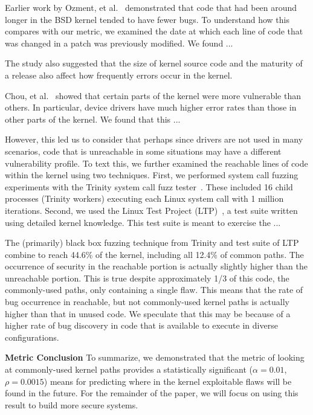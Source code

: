 Earlier work by Ozment, et al.~\cite{ozment2006milk} demonstrated that code that
had been around longer in the BSD kernel tended to have fewer bugs.  To
understand how this compares with our metric, we examined the date at which
each line of code that was changed in a patch was previously modified.  We
found ...


The study also suggested that the size of kernel source code and the
maturity of a release also affect how frequently errors occur in the kernel.

Chou, et al.~\cite{PittSFIeld} showed that certain parts of the kernel
were more vulnerable than others. In particular, device drivers have 
much higher error rates than those in other parts of the kernel.
We found that this ...


However, this led us to consider that perhaps since drivers are not used
in many scenarios, code that is unreachable in some situations may have a 
different vulnerability profile.  To text this, we 
further examined the reachable lines of 
code within the kernel using two techniques.  First, 
we performed system call fuzzing experiments with the Trinity
system call fuzz tester~\cite{Trinity}. These included 16 child processes
(Trinity workers) executing each Linux system call with 1 million iterations.
Second, we used the Linux Test Project (LTP)~\cite{LTP}, a test suite written
using detailed kernel knowledge.  This test suite is meant to exercise the ...

The (primarily) black box fuzzing technique from Trinity and test suite of
LTP combine to reach 44.6\% of the kernel, including all 12.4\% of common
paths.  The occurrence of security in the reachable portion is actually 
slightly higher than the unreachable portion.  This is true despite
approximately 1/3 of this code, the commonly-used paths, only containing
a single flaw.  This means that the rate of bug occurrence in reachable, but
not commonly-used kernel paths is actually higher than that in unused
code.  We speculate that this may be because of a higher rate of bug discovery
in code that is available to execute in diverse configurations.


\textbf{Metric Conclusion}
To summarize, we demonstrated that the metric of looking at commonly-used
kernel paths provides a statistically significant ($\alpha=0.01$, 
$\rho=0.0015$) means for predicting where in the kernel exploitable flaws 
will be found in the future.  For the remainder of the paper, we will 
focus on using this result to build more secure systems.


